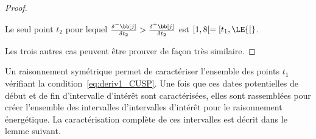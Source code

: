 \begin{proof}
\begin{minipage}{\linewidth}
\begin{minipage}{0.55\linewidth}
\begin{figure}[H]
  \end{figure}
\end{minipage}
\end{minipage}

Le seul point $t_2$ pour lequel $ \frac{\delta^{-}\bb[j]}{\delta t_2} >
\frac{\delta^{+}\bb[j]}{\delta t_2}$ est $[1,8[= [t_1, \LE{[}$. 

Les trois autres cas peuvent être prouver de façon très similaire. 
\end{proof}

Un raisonnement symétrique permet de caractériser l'ensemble des
points $t_1$ vérifiant la condition~\eqref{eq:deriv1_CUSP}. Une fois
que ces dates potentielles de début et de fin d'intervalle d'intérêt
sont caractérisées, elles sont rassemblées pour créer l'ensemble des
intervalles d'intervalles d'intérêt pour le raisonnement énergétique. 
La caractérisation complète de ces intervalles est décrit dans le
lemme suivant.

